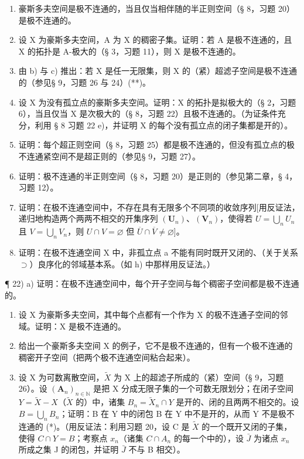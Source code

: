 \begin{enumerate}
\def\labelenumi{\alph{enumi})}
\setcounter{enumi}{1}
\item
  豪斯多夫空间是极不连通的，当且仅当相伴随的半正则空间（§ 8，习题 20）是极不连通的。
\item
  设 X 为豪斯多夫空间，A 为 X 的稠密子集。证明：若 A 是极不连通的，且 X 的拓扑是 A-极大的（§ 3，习题 11），则 X 是极不连通的。
\item
  由 b) 与 c) 推出：若 X 是任一无限集，则 X 的（紧）超滤子空间是极不连通的（参见§ 9，习题 26 与 24）(**)。
\item
  设 X 为没有孤立点的豪斯多夫空间。证明：X 的拓扑是拟极大的（§ 2，习题 6），当且仅当 X 是次极大的（§ 8，习题 22）且极不连通的。（为证条件充分，利用 § 8 习题 22 e)，并证明 X 的每个没有孤立点的闭子集都是开的）。
\item
  证明：每个超正则空间（§ 8，习题 25）都是极不连通的，但没有孤立点的极不连通紧空间不是超正则的（参见§ 9，习题 27）。
\item
  证明：极不连通的半正则空间（§ 8，习题 20）是正则的（参见第二章，§ 4，习题 12）。
\item
  证明：在极不连通空间中，不存在具有无限多个不同项的收敛序列{[}用反证法，递归地构造两个两两不相交的开集序列 \((\mathbf{U}_{n})\)、\((\mathbf{V}_{n})\)，使得若 \(U = \bigcup_{n} U_{n}\) 且 \(V = \bigcup_{n} V_{n}\)，则 \(U \cap V = \varnothing\) 但 \(\overline{U} \cap \overline{V} \neq \varnothing\){]}。
\item
  证明：在极不连通空间 X 中，非孤立点 a 不能有同时既开又闭的、（关于关系 \(\supset\)）良序化的邻域基本系。（如 h) 中那样用反证法。）
\end{enumerate}

¶ 22) a) 证明：在极不连通空间中，每个开子空间与每个稠密子空间都是极不连通的。

\begin{enumerate}
\def\labelenumi{\alph{enumi})}
\setcounter{enumi}{1}
\item
  设 X 为豪斯多夫空间，其中每个点都有一个作为 X 的极不连通子空间的邻域。证明：X 是极不连通的。
\item
  给出一个豪斯多夫空间 X 的例子，它不是极不连通的，但有一个极不连通的稠密开子空间（把两个极不连通空间粘合起来）。
\item
  设 X 为可数离散空间，\(\tilde{X}\) 为 X 上的超滤子所成的（紧）空间（§ 9，习题 26）。设 \((\mathbf{A}_{n})_{n\in\mathbb{N}}\) 是把 X 分成无限子集的一个可数无限划分；在闭子空间 \(Y=\tilde{X}-X\)（\(\tilde{X}\) 的）中，诸集 \(B_{n}=\tilde{X}_{n}\cap Y\) 是开的、闭的且两两不相交的。设 \(B=\bigcup_{n}B_{n}\)；证明：B 在 Y 中的闭包 B 在 Y 中不是开的，从而 Y 不是极不连通的 (*)。（用反证法：利用习题 20，设 C 是 \(\tilde{X}\) 的一个既开又闭的子集，使得 \(C\cap Y=B\)；考察点 \(x_{n}\)（诸集 \(C\cap A_{n}\) 的每一个中的），设 \(\bar{J}\) 为诸点 \(x_{n}\) 所成之集 J 的闭包，并证明 \(\bar{J}\) 不与 B 相交）。
\end{enumerate}

